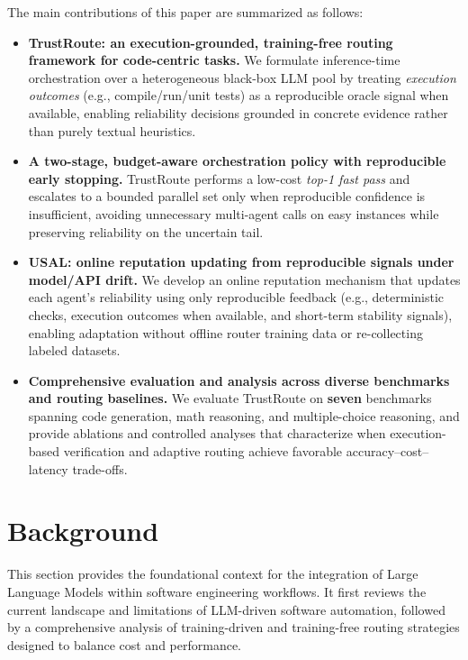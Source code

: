 \documentclass[acmsmall,screen,review,anonymous]{acmart}
\begin{document}
The main contributions of this paper are summarized as follows:
\begin{itemize}
    \item \textbf{TrustRoute: an execution-grounded, training-free routing framework for code-centric tasks.}
    We formulate inference-time orchestration over a heterogeneous black-box LLM pool by treating
    \emph{execution outcomes} (e.g., compile/run/unit tests) as a reproducible oracle signal when available,
    enabling reliability decisions grounded in concrete evidence rather than purely textual heuristics.

    \item \textbf{A two-stage, budget-aware orchestration policy with reproducible early stopping.}
    TrustRoute performs a low-cost \emph{top-1 fast pass} and escalates to a bounded parallel set only when
    reproducible confidence is insufficient, avoiding unnecessary multi-agent calls on easy instances while
    preserving reliability on the uncertain tail.

    \item \textbf{USAL: online reputation updating from reproducible signals under model/API drift.}
    We develop an online reputation mechanism that updates each agent's reliability using only reproducible feedback
    (e.g., deterministic checks, execution outcomes when available, and short-term stability signals), enabling adaptation
    without offline router training data or re-collecting labeled datasets.

    \item \textbf{Comprehensive evaluation and analysis across diverse benchmarks and routing baselines.}
    We evaluate TrustRoute on \textbf{seven} benchmarks spanning code generation, math reasoning, and multiple-choice reasoning,
    and provide ablations and controlled analyses that characterize when execution-based verification and adaptive routing
    achieve favorable accuracy--cost--latency trade-offs.
\end{itemize}



\section{Background}

This section provides the foundational context for the integration of Large Language Models within software engineering workflows. It first reviews the current landscape and limitations of LLM-driven software automation, followed by a comprehensive analysis of training-driven and training-free routing strategies designed to balance cost and performance.
\end{document}
